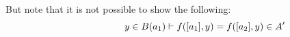 \noindent
				But note that it is not possible to show the following:
				\begin{equation}
				\hspace{2cm}y \in B(a_1) \vdash f([a_1], y) = f([a_2], y) \in A'\label{ex2-equality}
				\end{equation}
			
